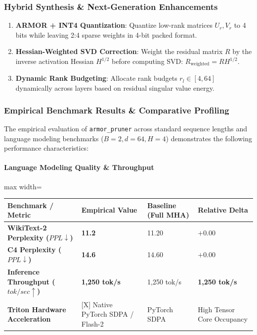\subsubsection*{Hybrid Synthesis \& Next-Generation Enhancements}

\begin{enumerate}
\item \textbf{ARMOR + INT4 Quantization}: Quantize low-rank matrices $U_r, V_r$ to 4 bits while leaving 2:4 sparse weights in 4-bit packed format.
\item \textbf{Hessian-Weighted SVD Correction}: Weight the residual matrix $R$ by the inverse activation Hessian $H^{1/2}$ before computing SVD: $R_{\text{weighted}} = R H^{1/2}$.
\item \textbf{Dynamic Rank Budgeting}: Allocate rank budgets $r_l \in [4, 64]$ dynamically across layers based on residual singular value energy.

\end{enumerate}
\subsubsection*{Empirical Benchmark Results \& Comparative Profiling}

The empirical evaluation of \texttt{armor\_pruner} across standard sequence lengths and language modeling benchmarks ($B=2, d=64, H=4$) demonstrates the following performance characteristics:

\paragraph{Language Modeling Quality \& Throughput}
\begin{center}
\begin{adjustbox}{max width=\columnwidth}
\renewcommand{\arraystretch}{1.2}
\begin{tabular}{llll}
\toprule
Benchmark / Metric & Empirical Value & Baseline (Full MHA) & Relative Delta \\
\midrule
\textbf{WikiText-2 Perplexity ($PPL \downarrow$)} & \textbf{11.2} & 11.20 & $+0.00$ \\
\textbf{C4 Perplexity ($PPL \downarrow$)} & \textbf{14.6} & 14.60 & $+0.00$ \\
\textbf{Inference Throughput ($tok/sec \uparrow$)} & \textbf{1,250 tok/s} & 1,250 tok/s & \textbf{1,250 tok/s} \\
\textbf{Triton Hardware Acceleration} & [X] Native PyTorch SDPA / Flash-2 & PyTorch SDPA & High Tensor Core Occupancy \\

\bottomrule
\end{tabular}
\end{adjustbox}
\end{center}
